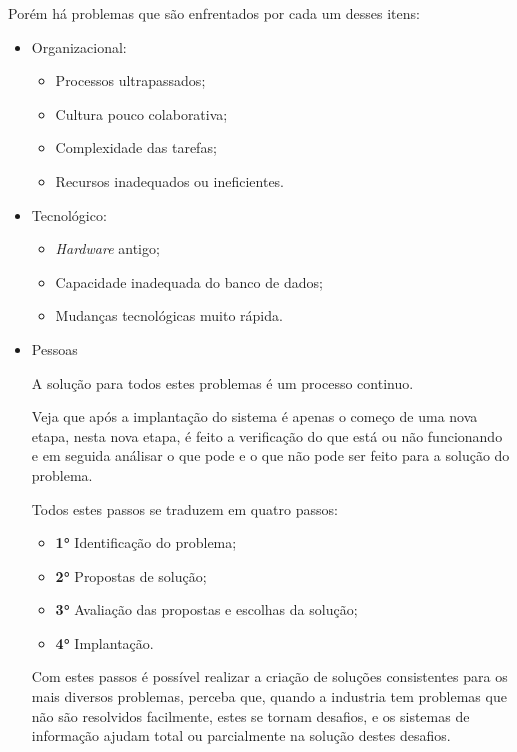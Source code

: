 \documentclass[
	12pt,				%
	openany,			%
	a4paper,			%
	chapter=TITLE,		%
	section=TITLE,		%
	english,
	brazil				%
]{abntex2}
\begin{document}
Porém há problemas que são enfrentados por cada um desses itens:
	\begin{itemize}
		\item Organizacional:
			\begin{itemize}
				\item Processos ultrapassados;
				\item Cultura pouco colaborativa;
				\item Complexidade das tarefas;
				\item Recursos inadequados ou ineficientes.
			\end{itemize}
		\item Tecnológico:
		\begin{itemize}
			\item \textit{Hardware} antigo;
			\item Capacidade inadequada do banco de dados;
			\item Mudanças tecnológicas muito rápida.
		\end{itemize}
		\item Pessoas

A solução para todos estes problemas é um processo continuo.

Veja que após a implantação do sistema é apenas o começo de uma nova etapa, nesta nova etapa, é feito a verificação do que está ou não funcionando e em seguida análisar o que pode e o que não pode ser feito para a solução do problema. 

Todos estes passos se traduzem em quatro passos:

\begin{itemize}
	\item \textbf{1°} Identificação do problema;
	\item \textbf{2°} Propostas de solução; 
	\item \textbf{3°} Avaliação das propostas e escolhas da solução;
	\item \textbf{4°} Implantação.
\end{itemize}

Com estes passos é possível realizar a criação de soluções consistentes para os mais diversos problemas, perceba que, quando a industria tem problemas que não são resolvidos facilmente, estes se tornam desafios, e os sistemas de informação ajudam total ou parcialmente na solução destes desafios.


\end{itemize}
\end{document}
